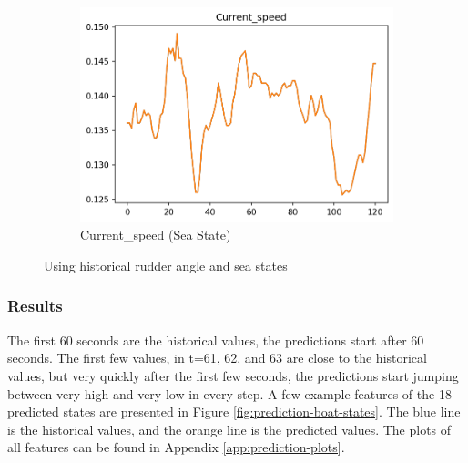 \documentclass[12pt,twoside]{report}
\begin{document}
\begin{figure}[h]
\begin{subfigure}[b]{0.32\textwidth}
         \includegraphics[width=\textwidth]{figures/prediction-plots/Current_speed.png}
         \caption{Current\_speed (Sea State)}
     \end{subfigure}
        \caption{Using historical rudder angle and sea states}
        \label{fig:prediction-sea-rudder}
\end{figure}

\subsubsection{Results}
The first 60 seconds are the historical values, the predictions start after 60 seconds. The first few values, in t=61, 62, and 63 are close to the historical values, but very quickly after the first few seconds, the predictions start jumping between very high and very low in every step. A few example features of the 18 predicted states are presented in Figure \ref{fig:prediction-boat-states}. The blue line is the historical values, and the orange line is the predicted values. The plots of all features can be found in Appendix \ref{app:prediction-plots}.
\end{document}
